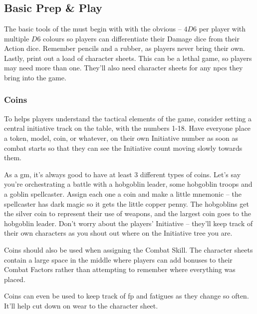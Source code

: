 \chapter{}

\section{Basic Prep \& Play}

\begin{multicols}{2}

\noindent
The basic tools of the  must begin with with the obvious -- $4D6$ per player with multiple $D6$ colours so players can differentiate their Damage dice from their Action dice.
Remember pencils and a rubber, as players never bring their own.
Lastly, print out a load of character sheets.
This can be a lethal game, so players may need more than one.
They'll also need character sheets for any \glspl{npc} they bring into the game.

\subsection{Coins}

To helps players understand the tactical elements of the game, consider setting a central initiative track on the table, with the numbers 1-18.
Have everyone place a token, model, coin, or whatever, on their own Initiative number as soon as combat starts so that they can see the Initiative count moving slowly towards them.

As a \gls{gm}, it's always good to have at least 3 different types of coins.
Let's say you're orchestrating a battle with a hobgoblin leader, some hobgoblin troops and a goblin spellcaster.
Assign each one a coin and make a little mnemonic -- the spellcaster has dark magic so it gets the little copper penny.
The hobgoblins get the silver coin to represent their use of weapons, and the largest coin goes to the hobgoblin leader.
Don't worry about the players' Initiative -- they'll keep track of their own characters as you shout out where on the Initiative tree you are.

Coins should also be used when assigning the Combat Skill.
The character sheets contain a large space in the middle where players can add bonuses to their Combat Factors rather than attempting to remember where everything was placed.

Coins can even be used to keep track of \gls{fp} and \glspl{fatigue} as they change so often.
It'll help cut down on wear to the character sheet.


\end{multicols}
